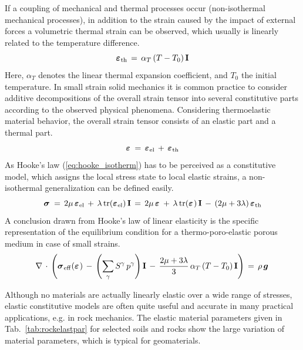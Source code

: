 If a coupling of mechanical and thermal processes occur (non-isothermal mechanical processes), in addition to the strain caused by the
impact of external forces a volumetric thermal strain can be observed, which usually is linearly related to
the temperature difference.
\begin{equation}
\mbox{${\mbox{\boldmath${\varepsilon}$\unboldmath}}_{\:\!\mathrm{th}}$}\,=\,\alpha_T\,(T-T_0)\,\mathbf{I}
\end{equation}
Here, $\alpha_T$ denotes the linear thermal expansion coefficient, and $T_0$ the initial temperature. In small strain solid mechanics it is
common practice to consider additive decompositions of the overall strain tensor into several constitutive parts according to the observed
physical phenomena. Considering thermoelastic material behavior, the overall strain tensor consists of an elastic part and a thermal part.
\begin{equation}
\mbox{${\mbox{\boldmath${\varepsilon}$\unboldmath}}_{\:\!}$}\,=\,\mbox{${\mbox{\boldmath${\varepsilon}$\unboldmath}}_{\:\!\mathrm{el}}$}\,+\,\mbox{${\mbox{\boldmath${\varepsilon}$\unboldmath}}_{\:\!\mathrm{th}}$}
\end{equation}
As Hooke's law (\ref{eq:hooke_isotherm}) has to be perceived as a constitutive model, which assigns the local stress state to local elastic
strains, a non-isothermal generalization can be defined easily. 
\begin{equation}
\miu{\sigma}{}{}\,=\,2\mu\,\miu{\varepsilon}{\mathrm{el}}{}\,+\,\lambda\,\mathrm{tr}(\miu{\varepsilon}{\mathrm{el}}{})\,\mathbf{I}
                \,=\,2\mu\,\miu{\varepsilon}{}{}\,+\,\lambda\,\mathrm{tr}(\miu{\varepsilon}{}{})\,\mathbf{I}
                \,-\,(2\mu+3\lambda)\,\miu{\varepsilon}{\mathrm{th}}{}
\label{eq:hooke_nonisotherm}
\end{equation}
A conclusion drawn from Hooke's law of linear elasticity is the specific representation of the equilibrium condition for a thermo-poro-elastic porous medium in case of small strains.
\begin{equation}
\nabla\,\cdot\,
\left(
\miu{\sigma}{\mathrm{eff}}{}{}(\miu{\varepsilon}{}{})\,-\,
\left(\sum\limits_{\gamma}S^{\gamma}\,p^{\gamma}\right)\mathbf{I}\,-\,
\frac{2\mu+3\lambda}{3}\,\alpha_T\,(T-T_0)\,\mathbf{I}
\right)
\,=\,\rho\,\mio{g}{}{}
\label{eq:equi_thermo_poro_elast}
\end{equation}

Although no materials are actually linearly elastic over a wide range of stresses, elastic constitutive models are often quite useful and
accurate in many practical applications, e.g. in rock mechanics. The elastic material parameters given in Tab.~\ref{tab:rockelastpar} for 
selected soils and rocks show the large variation of material parameters, which is typical for geomaterials. 

